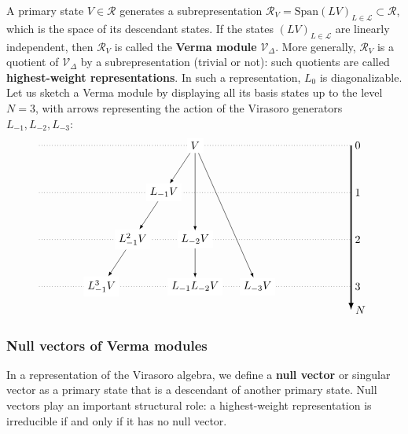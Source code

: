 \documentclass[12pt, a4paper]{article}
\theoremstyle{break}
\begin{document}
A primary state $V{} \in \mathcal{R}$ generates a subrepresentation $\mathcal{R}_{V{}}= \text{Span}(LV{})_{L\in\mathcal{L}}\subset\mathcal{R}$, which is the space of its descendant states. If the states $(LV{})_{L\in\mathcal{L}}$ are linearly independent, then $\mathcal{R}_{V{}}$ is called the \textbf{Verma module} $\mathcal{V}_\Delta$. More generally, $\mathcal{R}_{V{}}$ is a quotient of $\mathcal{V}_\Delta$ by a subrepresentation (trivial or not): such quotients are called \textbf{highest-weight representations}. In such a representation, $L_0$ is diagonalizable. 
Let us sketch a Verma module by displaying all its basis states up to the level $N=3$, with arrows representing the action of the Virasoro generators $L_{-1},L_{-2},L_{-3}$:
\begin{align}
 \begin{tikzpicture}[scale = .25, baseline=(current  bounding  box.center)]
  \draw[-latex, very thick] (20, 0) -- (20, -21) node [right] {$N$};
  \foreach \x in {0, ..., 3}
  {
  \draw [dotted] (-20, {-6*\x}) -- (20, {-6*\x}) node [right] {${\x}$};
  }
  \node[fill = white] at (0, 0) (0) {$V{}$};
  \node[fill = white] at (-4,-6) (1) {$L_{-1}V{}$};
  \node[fill = white] at (-8, -12) (11) {$L_{-1}^2V{}$};
  \node[fill = white] at (-12, -18) (111) {$L_{-1}^3V{}$};
  \node[fill = white] at (0,-12) (2) {$L_{-2}V{}$};
  \node[fill = white] at (0,-18) (12) {$L_{-1}L_{-2}V{}$};
  \node[fill = white] at (8,-18) (3) {$L_{-3}V{}$};
  \draw[-latex] (0) -- (1);
  \draw[-latex] (1) -- (11);
  \draw[-latex] (11) -- (111);
  \draw[-latex] (0) -- (2);
  \draw[-latex] (0) -- (3);
  \draw[-latex] (2) -- (12);
 \end{tikzpicture}
\end{align}

\subsubsection{Null vectors of Verma modules}\label{sec:nvvm}

In a representation of the Virasoro algebra, we define a \textbf{null vector} or singular vector as a primary state that is a descendant of another primary state. Null vectors play an important structural role: a highest-weight representation is irreducible if and only if it has no null vector. 
\end{document}
